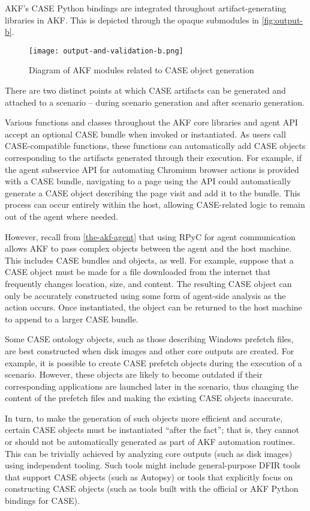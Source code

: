 AKF's CASE Python bindings are integrated throughout artifact-generating
libraries in AKF. This is depicted through the opaque submodules in
\autoref{fig:output-b}.

\begin{figure}[h]
\centering
\texttt{[image: output-and-validation-b.png]}
\caption{Diagram of AKF modules related to CASE object
generation}\label{fig:output-b}
\end{figure}

There are two distinct points at which CASE artifacts can be generated
and attached to a scenario -- during scenario generation and after
scenario generation.

Various functions and classes throughout the AKF core libraries and
agent API accept an optional CASE bundle when invoked or instantiated.
As users call CASE-compatible functions, these functions can
automatically add CASE objects corresponding to the artifacts generated
through their execution. For example, if the agent subservice API for
automating Chromium browser actions is provided with a CASE bundle,
navigating to a page using the API could automatically generate a CASE
object describing the page visit and add it to the bundle. This process
can occur entirely within the host, allowing CASE-related logic to
remain out of the agent where needed.

However, recall from \autoref{the-akf-agent} that using RPyC for agent communication allows AKF to pass
complex objects between the agent and the host machine. This includes
CASE bundles and objects, as well. For example, suppose that a CASE
object must be made for a file downloaded from the internet that
frequently changes location, size, and content. The resulting CASE
object can only be accurately constructed using some form of agent-side
analysis as the action occurs. Once instantiated, the object can be
returned to the host machine to append to a larger CASE bundle.

Some CASE ontology objects, such as those describing Windows prefetch
files, are best constructed when disk images and other core outputs are
created. For example, it is possible to create CASE prefetch objects
during the execution of a scenario. However, these objects are likely to
become outdated if their corresponding applications are launched later
in the scenario, thus changing the content of the prefetch files and
making the existing CASE objects inaccurate.

In turn, to make the generation of such objects more efficient and
accurate, certain CASE objects must be instantiated ``after the fact'';
that is, they cannot or should not be automatically generated as part of
AKF automation routines. This can be trivially achieved by analyzing
core outputs (such as disk images) using independent tooling. Such tools
might include general-purpose DFIR tools that support CASE objects (such
as Autopsy) or tools that explicitly focus on constructing CASE objects
(such as tools built with the official or AKF Python bindings for CASE).


